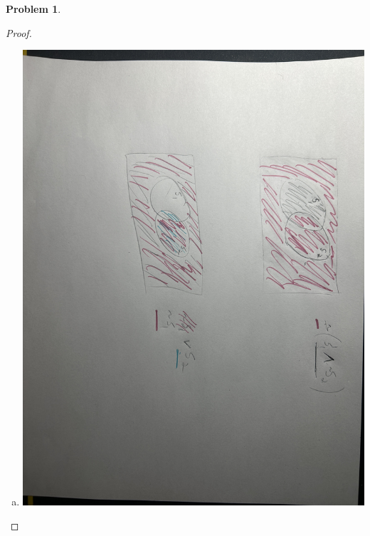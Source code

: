 \documentclass{article}
\newtheorem{prb}{Problem}
\begin{document}
	   \begin{prb}  \end{prb} 
	   \begin{proof} 
	   	\begin{enumerate}[(a)]
			\item \includegraphics[scale=.1]{one.jpg} 


\end{enumerate}
\end{proof}
\end{document}
